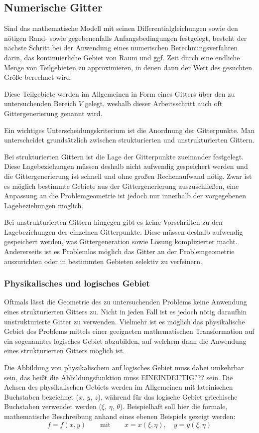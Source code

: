 \subsection{Numerische Gitter}
\label{sec:num_gitter}

Sind das mathematische Modell mit seinen Differentialgleichungen sowie den nötigen
Rand- sowie gegebenenfalls Anfangsbedingungen festgelegt, besteht der nächste Schritt
bei der Anwendung eines numerischen Berechnungsverfahren darin, das kontinuierliche
Gebiet von Raum und ggf. Zeit durch eine endliche Menge von Teilgebieten zu approximieren,
in denen dann der Wert des gesuchten Größe berechnet wird.

Diese Teilgebiete werden im Allgemeinen in Form eines Gitters über den zu untersuchenden
Bereich $V$ gelegt, weshalb dieser Arbeitsschritt auch oft Gittergenerierung genannt wird.

Ein wichtiges Unterscheidungskriterium ist die Anordnung der Gitterpunkte.
Man unterscheidet grundsätzlich zwischen strukturierten und unstrukturierten Gittern.

Bei strukturierten Gittern ist die Lage der Gitterpunkte zueinander festgelegt. Diese
Lagebeziehungen müssen deshalb nicht aufwendig gespeichert werden und die Gittergenerierung
ist schnell und ohne großen Rechenaufwand nötig. Zwar ist es möglich bestimmte Gebiete
aus der Gittergenerierung auszuschließen, eine Anpassung an die Problemgeometrie ist
jedoch nur innerhalb der vorgegebenen Lagebeziehungen möglich.

Bei unstrukturierten Gittern hingegen gibt es keine Vorschriften zu den Lagebeziehungen
der einzelnen Gitterpunkte. Diese müssen deshalb aufwendig gespeichert werden, was
Gittergeneration sowie Lösung komplizierter macht. Andererseits ist es Problemlos möglich
das Gitter an der Problemgeometrie auszurichten oder in bestimmten Gebieten selektiv zu verfeinern.

\subsubsection{Physikalisches und logisches Gebiet}

Oftmals lässt die Geometrie des zu untersuchenden Problems keine Anwendung eines
strukturierten Gitters zu. Nicht in jeden Fall ist es jedoch nötig daraufhin unstrukturierte
Gitter zu verwenden. Vielmehr ist es möglich das physikalische Gebiet des Problems
mittels einer geeigneten mathematischen Transformation auf ein sogenanntes
logisches Gebiet abzubilden, auf welchem dann die Anwendung eines strukturierten Gitters
möglich ist.

Die Abbildung von physikalischem auf logisches Gebiet muss dabei umkehrbar sein, das heißt
die Abbildungsfunktion muss EINEINDEUTIG??? sein. Die Achsen des physikalischen Gebiets
werden im Allgemeinen mit lateinischen Buchstaben bezeichnet ($x$, $y$, $z$), während
für das logische Gebiet griechische Buchstaben verwendet werden ($\xi$, $\eta$, $\theta$).
Beispielhaft soll hier die formale, mathematische Beschreibung anhand eines ebenen
Beispiels gezeigt werden:
\begin{equation}
  f=f(x, y)\qquad \text{mit} \qquad x=x(\xi, \eta),\quad y=y(\xi, \eta)
\end{equation}


